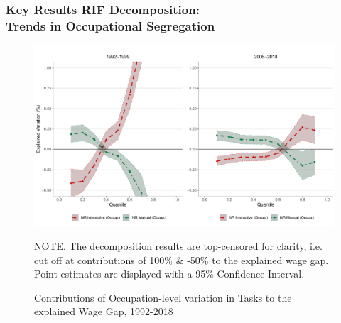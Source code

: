 \documentclass[10pt]{beamer}
\begin{document}




\begin{frame}[label=occ_spec] 
	\frametitle{Key Results RIF Decomposition: \\ Trends in  Occupational Segregation}
	
	
	\begin{figure}[H]
		\begin{minipage}{0.95\textwidth} %
			\centering
			\includegraphics[scale=0.32]{rif_bw_nrinrm}
			\caption{Contributions of Occupation-level variation in Tasks to the explained Wage Gap, 1992-2018 \label{fig:wgap_subs} \label{fig:wage_gap_base}}
			{\footnotesize \tiny NOTE. \textemdash The decomposition results are top-censored for clarity, i.e. cut off at contributions of 100\% \& -50\% to the explained wage gap. \\ Point estimates are displayed with a 95\% Confidence Interval. \par}
		\end{minipage}
	\end{figure}
	
	
	
	\hyperlink{regression}{}
		
\end{frame}
\end{document}
